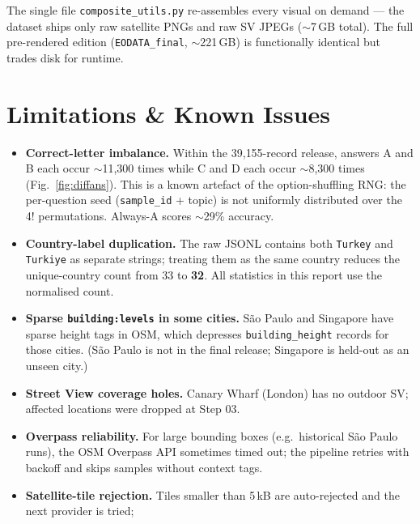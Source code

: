\documentclass[11pt,a4paper]{article}
\begin{document}
\noindent The single file \texttt{composite\_utils.py} re-assembles every
visual on demand --- the dataset ships only raw satellite PNGs and
raw SV JPEGs ($\sim$7\,GB total). The full pre-rendered edition
(\texttt{EODATA\_final}, $\sim$221\,GB) is functionally identical but
trades disk for runtime.

\section{Limitations \& Known Issues}
\label{sec:limits}

\begin{itemize}[itemsep=3pt]
  \item \textbf{Correct-letter imbalance.} Within the 39{,}155-record
        release, answers A and B each occur $\sim$11{,}300 times while
        C and D each occur $\sim$8{,}300 times (Fig.~\ref{fig:diffans}).
        This is a known artefact of the option-shuffling RNG: the
        per-question seed (\texttt{sample\_id} + topic) is not
        uniformly distributed over the 4! permutations. Always-A
        scores $\sim$29\% accuracy.
  \item \textbf{Country-label duplication.} The raw JSONL contains
        both \texttt{Turkey} and \texttt{Turkiye} as separate strings;
        treating them as the same country reduces the unique-country
        count from 33 to \textbf{32}. All statistics in this report
        use the normalised count.
  \item \textbf{Sparse \texttt{building:levels} in some cities.}
        São Paulo and Singapore have sparse height tags in OSM,
        which depresses \texttt{building\_height} records for those
        cities. (São Paulo is not in the final release; Singapore is
        held-out as an unseen city.)
  \item \textbf{Street View coverage holes.} Canary Wharf
        (London) has no outdoor SV; affected locations were dropped
        at Step 03.
  \item \textbf{Overpass reliability.} For large bounding boxes
        (e.g.\ historical São Paulo runs), the OSM Overpass API
        sometimes timed out; the pipeline retries with backoff and
        skips samples without context tags.
  \item \textbf{Satellite-tile rejection.} Tiles smaller than
        5\,kB are auto-rejected and the next provider is tried;

\end{itemize}
\end{document}
